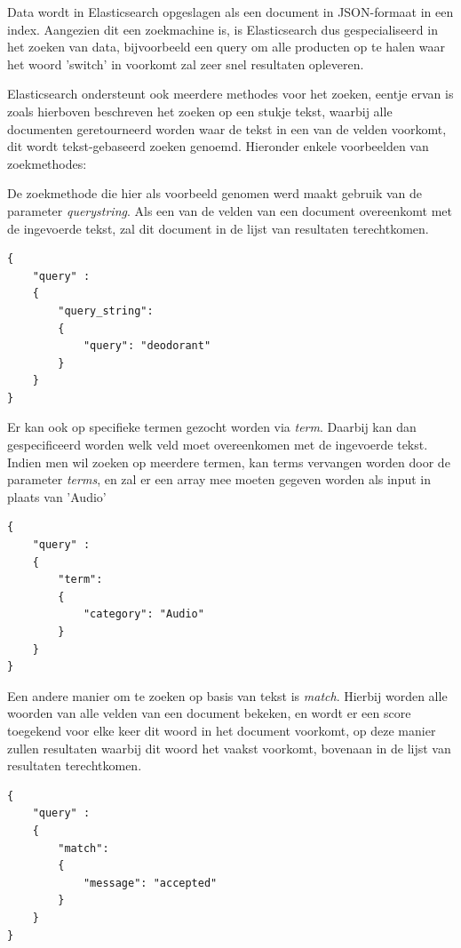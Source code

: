 Data wordt in Elasticsearch opgeslagen als een document in JSON-formaat in een index. Aangezien dit een zoekmachine is, is Elasticsearch dus gespecialiseerd in het zoeken van data, bijvoorbeeld een query om alle producten op te halen waar het woord 'switch' in voorkomt zal zeer snel resultaten opleveren.  

Elasticsearch ondersteunt ook meerdere methodes voor het zoeken, eentje ervan is zoals hierboven beschreven het zoeken op een stukje tekst, waarbij alle documenten geretourneerd worden waar de tekst in een van de velden voorkomt, dit wordt tekst-gebaseerd zoeken genoemd.  Hieronder enkele voorbeelden van zoekmethodes:  

De zoekmethode die hier als voorbeeld genomen werd maakt gebruik van de parameter \textit{query\textunderscore string}. Als een van de velden van een document overeenkomt met de ingevoerde tekst, zal dit document in de lijst van resultaten terechtkomen.

\begin{lstlisting}[caption={Tekst-gebaseerd zoeken: Query om een simpele zoekopdracht uit te voeren met de term 'deodorant'}]
{
	"query" : 
	{
		"query_string": 
		{
			"query": "deodorant"
		}
	}
}
\end{lstlisting}

Er kan ook op specifieke termen gezocht worden via \textit{term}. Daarbij kan dan gespecificeerd worden welk veld moet overeenkomen met de ingevoerde tekst. 
Indien men wil zoeken op meerdere termen, kan terms vervangen worden door de parameter \textit{terms}, en zal er een array mee moeten gegeven worden als input in plaats van 'Audio' 

\begin{lstlisting}[caption={Tekst-gebaseerd zoeken: Query om een simpele zoekopdracht uit te voeren waar de categorie van het product overeen komt met 'Audio' }]
{
	"query" : 
	{
		"term": 
		{
			"category": "Audio"
		}
	}
}
\end{lstlisting}

Een andere manier om te zoeken op basis van tekst is \textit{match}. Hierbij worden alle woorden van alle velden van een document bekeken, en wordt er een score toegekend voor elke keer dit woord in het document voorkomt, op deze manier zullen resultaten waarbij dit woord het vaakst voorkomt, bovenaan in de lijst van resultaten terechtkomen. 

\begin{lstlisting}[caption={Tekst-gebaseerd zoeken: Query die de resultaten sorteert op basis van hoe vaak het woord 'accepted' voorkomt in het veld 'message' van een document }]
{
	"query" : 
	{
		"match": 
		{
			"message": "accepted"
		}
	}
}
\end{lstlisting}

